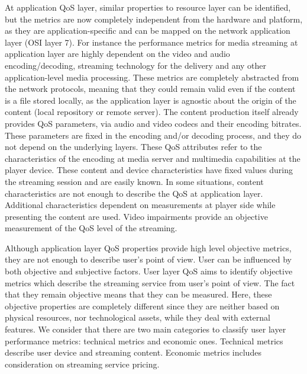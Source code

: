 At application QoS layer, similar properties to resource layer can be
identified, but the metrics are now completely independent from the hardware and platform, as they are application-specific and can be mapped on the network application layer (OSI layer 7). For instance the performance metrics for media streaming at application layer are highly dependent on the video and audio encoding/decoding, streaming technology for the delivery and any other application-level media processing. These metrics are completely abstracted from the network protocols, meaning that they could remain valid even if the content is a file stored locally, as the application layer is agnostic about the origin of the content (local repository or remote server). The content production itself already provides QoS parameters, via audio and video codecs and their encoding bitrates. These parameters are fixed in the encoding and/or decoding process, and they do not depend on the underlying layers. These QoS attributes refer to the characteristics of the encoding at media server and multimedia capabilities at the player device. These content and device characteristics have fixed values during the streaming session and are easily known. %
In some situations, content characteristics are not enough to describe the QoS at application layer. %
Additional characteristics dependent on measurements at player side while presenting the content are used. Video impairments provide an objective measurement of the QoS level of the streaming.

Although application layer QoS properties provide high level objective metrics, they are not enough to describe user's point of view. User can be influenced by both objective and subjective factors. User layer QoS aims to identify objective metrics which describe the streaming service from user's point of view. The fact that they remain objective means that they can be measured. Here, these objective properties are completely different since they are neither based on physical resources, nor technological assets, while they deal with external features. We consider that there are two main categories to classify user layer performance metrics: technical metrics and economic ones. Technical metrics describe user device and streaming content. Economic metrics includes consideration on streaming service pricing.

